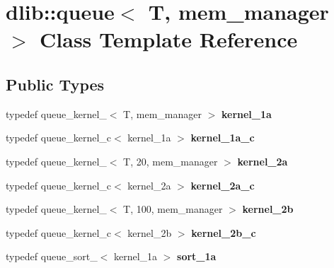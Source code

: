 \hypertarget{classdlib_1_1queue}{
\section{dlib::queue$<$ T, mem\_\-manager $>$ Class Template Reference}
\label{classdlib_1_1queue}
}
\subsection*{Public Types}
\begin{DoxyCompactItemize}
\item 
\hypertarget{classdlib_1_1queue_a14ee6503764b6c9f9afa407c364857ef}{
typedef queue\_\-kernel\_$<$ T, mem\_\-manager $>$ {\bfseries kernel\_\-1a}}
\label{classdlib_1_1queue_a14ee6503764b6c9f9afa407c364857ef}

\item 
\hypertarget{classdlib_1_1queue_a7ab77eeb5d1a184eb9646181ebeac3e6}{
typedef queue\_\-kernel\_\-c$<$ kernel\_\-1a $>$ {\bfseries kernel\_\-1a\_\-c}}
\label{classdlib_1_1queue_a7ab77eeb5d1a184eb9646181ebeac3e6}

\item 
\hypertarget{classdlib_1_1queue_a103481f71a51167889230b6f01ad4609}{
typedef queue\_\-kernel\_$<$ T, 20, mem\_\-manager $>$ {\bfseries kernel\_\-2a}}
\label{classdlib_1_1queue_a103481f71a51167889230b6f01ad4609}

\item 
\hypertarget{classdlib_1_1queue_a4e7d41c708ce943321b7d8626f1e11c7}{
typedef queue\_\-kernel\_\-c$<$ kernel\_\-2a $>$ {\bfseries kernel\_\-2a\_\-c}}
\label{classdlib_1_1queue_a4e7d41c708ce943321b7d8626f1e11c7}

\item 
\hypertarget{classdlib_1_1queue_a2c093dccb36ea9a77127f2a5ab5356a0}{
typedef queue\_\-kernel\_$<$ T, 100, mem\_\-manager $>$ {\bfseries kernel\_\-2b}}
\label{classdlib_1_1queue_a2c093dccb36ea9a77127f2a5ab5356a0}

\item 
\hypertarget{classdlib_1_1queue_a29bc94bd114f2f07e6db9b09abd19812}{
typedef queue\_\-kernel\_\-c$<$ kernel\_\-2b $>$ {\bfseries kernel\_\-2b\_\-c}}
\label{classdlib_1_1queue_a29bc94bd114f2f07e6db9b09abd19812}

\item 
\hypertarget{classdlib_1_1queue_a1b0ef2aa0008b998ab6c2e5044d152a6}{
typedef queue\_\-sort\_$<$ kernel\_\-1a $>$ {\bfseries sort\_\-1a}}
\label{classdlib_1_1queue_a1b0ef2aa0008b998ab6c2e5044d152a6}


\end{DoxyCompactItemize}
